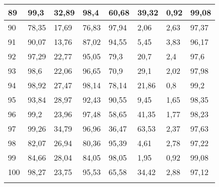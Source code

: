 \begin{longtable}[c]{|l|l|l|l|l|l|l|l|}
89              & 99,3         & 32,89        & 98,4        & 60,68         & 39,32         & 0,92          & 99,08         \\ \hline
90              & 78,35        & 17,69        & 76,83       & 97,94         & 2,06          & 2,63          & 97,37         \\ \hline
91              & 90,07        & 13,76        & 87,02       & 94,55         & 5,45          & 3,83          & 96,17         \\ \hline
92              & 97,29        & 22,77        & 95,05       & 79,3          & 20,7          & 2,4           & 97,6          \\ \hline
93              & 98,6         & 22,06        & 96,65       & 70,9          & 29,1          & 2,02          & 97,98         \\ \hline
94              & 98,92        & 27,47        & 98,14       & 78,14         & 21,86         & 0,8           & 99,2          \\ \hline
95              & 93,84        & 28,97        & 92,43       & 90,55         & 9,45          & 1,65          & 98,35         \\ \hline
96              & 99,2         & 23,96        & 97,48       & 58,65         & 41,35         & 1,77          & 98,23         \\ \hline
97              & 99,26        & 34,79        & 96,96       & 36,47         & 63,53         & 2,37          & 97,63         \\ \hline
98              & 82,07        & 26,94        & 80,36       & 95,39         & 4,61          & 2,78          & 97,22         \\ \hline
99              & 84,66        & 28,04        & 84,05       & 98,05         & 1,95          & 0,92          & 99,08         \\ \hline
100             & 98,27        & 23,75        & 95,53       & 65,58         & 34,42         & 2,88          & 97,12         \\ \hline
\label{anx:min}
\end{longtable}
